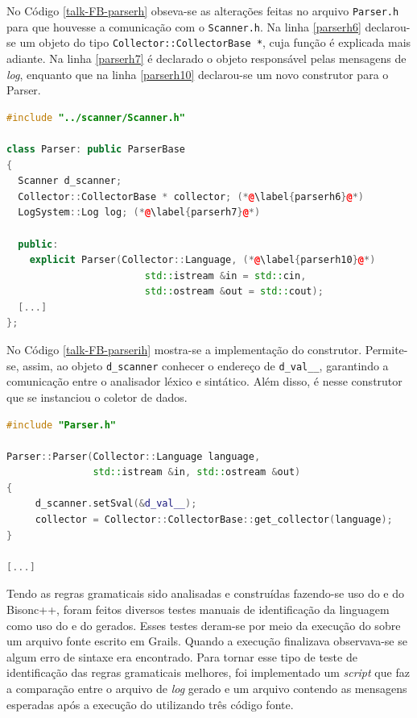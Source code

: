 No Código \ref{talk-FB-parserh} obseva-se as alterações feitas no arquivo
\lstinline|Parser.h| para que houvesse a comunicação com o \lstinline|Scanner.h|.
Na linha \ref{parserh6} declarou-se um objeto do tipo
\lstinline|Collector::CollectorBase *|, cuja função é explicada mais adiante.
Na linha \ref{parserh7} é declarado o objeto responsável pelas mensagens de
\textit{log}, enquanto que na linha \ref{parserh10} declarou-se um novo
construtor para o Parser.
\begin{lstlisting}[language=C++, label=talk-FB-parserh, caption=Alterações no Parser.h para comunicação entre Analisador Léxico e Sintático]
#include "../scanner/Scanner.h"

class Parser: public ParserBase
{
  Scanner d_scanner;
  Collector::CollectorBase * collector; (*@\label{parserh6}@*)
  LogSystem::Log log; (*@\label{parserh7}@*)

  public:
    explicit Parser(Collector::Language, (*@\label{parserh10}@*)
    					std::istream &in = std::cin,
    					std::ostream &out = std::cout);
  [...]
};
\end{lstlisting}

No Código \ref{talk-FB-parserih} mostra-se a implementação do construtor.
Permite-se, assim, ao objeto \lstinline|d_scanner| conhecer o endereço
de \lstinline|d_val__|, garantindo a comunicação entre o analisador léxico e
sintático. Além disso, é nesse construtor que se instanciou o coletor de
dados.
\begin{lstlisting}[language=C++, label=talk-FB-parserih, caption=Alterações no Parser.ih para comunicação entre Analisador Léxico e Sintático]
#include "Parser.h"

Parser::Parser(Collector::Language language,
			   std::istream &in, std::ostream &out)
{
	 d_scanner.setSval(&d_val__);
	 collector = Collector::CollectorBase::get_collector(language);
}

[...]
\end{lstlisting}

Tendo as regras gramaticais sido analisadas e construídas fazendo-se uso
do \flexcpp e do \textsf{Bisonc++}, foram feitos diversos testes manuais
de identificação da linguagem \grails como uso do \parser e do \scanner
gerados. Esses testes deram-se por meio da execução do \parser sobre um
arquivo fonte escrito em \textsf{Grails}. Quando a execução finalizava
observava-se se algum erro de sintaxe era encontrado. Para tornar esse
tipo de teste de identificação das regras gramaticais melhores, foi
implementado um \textit{script} que faz a comparação entre o arquivo de
\textit{log} gerado e um arquivo contendo as mensagens esperadas após
a execução do \parser utilizando três código fonte.

